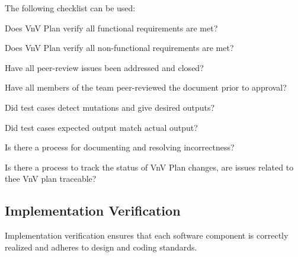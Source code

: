 \documentclass[12pt, titlepage]{article}
\begin{document}
The following checklist can be used:
\begin{todolist}
  \item Does VnV Plan verify all functional requirements are met?
  \item Does VnV Plan verify all non-functional requirements are met?
  \item Have all peer-review issues been addressed and closed?
  \item Have all members of the team peer-reviewed the document prior to approval?
  \item Did test cases detect mutations and give desired outputs?
  \item Did test cases expected output match actual output?
  \item Is there a process for documenting and resolving incorrectness?
  \item Is there a process to track the status of VnV Plan changes, are issues related to thee VnV plan traceable?
\end{todolist}

\subsection{Implementation Verification}
\label{subsec:implementation-verification}


Implementation verification ensures that each software component is correctly
realized and adheres to design and coding standards.
\end{document}
